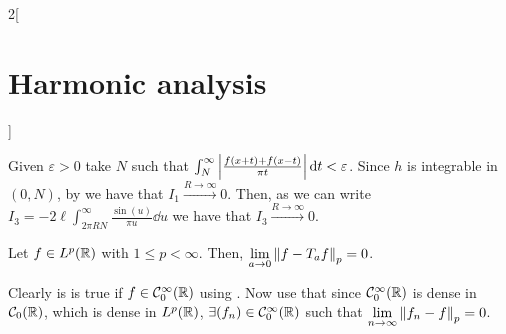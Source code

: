 \documentclass[../../../main_math.tex]{subfiles}
\begin{document}
\begin{multicols}{2}[\section{Harmonic analysis}]
\begin{sproof}
    Given $\varepsilon>0$ take $N$ such that $\int_N^\infty\abs{\frac{f(x+t)+f(x-t)}{\pi t}}\dd{t}<\varepsilon$. Since $h$ is integrable in $(0,N)$, by  we have that $I_1\overset{R\to\infty}{\longrightarrow}0$. Then, as we can write $I_3=-2\ell \int_{2\pi RN}^\infty \frac{\sin(u)}{\pi u}\dd{u}$ we have that $I_3\overset{R\to\infty}{\longrightarrow}0$.
  \end{sproof}
  \begin{lemma}\label{HA:translated}
    Let $f\in L^p(\mathbb{R})$ with $1\leq p<\infty$. Then, $\displaystyle \lim_{a\to 0}\left\|f-T_af\right\|_p=0$.
  \end{lemma}
  \begin{sproof}
    Clearly is is true if $f\in\mathcal{C}_0^\infty(\mathbb{R})$ using . Now use that since $\mathcal{C}_0^\infty(\mathbb{R})$ is dense in $\mathcal{C}_0(\mathbb{R})$, which is dense in $L^p(\mathbb{R})$, $\exists(f_n)\in \mathcal{C}_0^\infty(\mathbb{R})$ such that $\displaystyle\lim_{n\to\infty}\left\|f_n-f\right\|_p=0$.
  \end{sproof}

\end{multicols}
\end{document}
